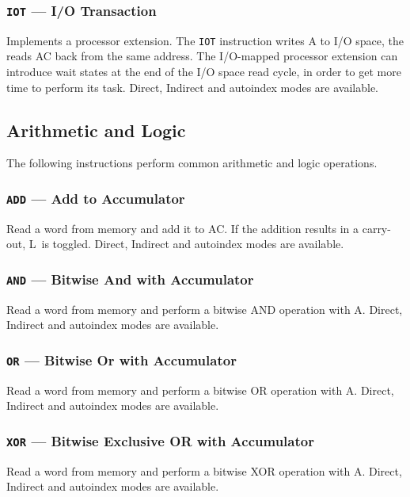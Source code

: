 \documentclass[11pt,a4paper,twocolumns]{article}
\newcommand\register[1]{\textsf{#1}}
\newcommand\A{\register{AC}}
\newcommand\Lreg{\register{L}}
\begin{document}
\subsubsection{{\tt IOT} — I/O Transaction}
\label{sec-iot}

Implements a processor extension. The {\tt IOT} instruction writes A
to I/O space, the reads \A{} back from the same address. The I/O-mapped
processor extension can introduce wait states at the end of the I/O
space read cycle, in order to get more time to perform its
task. Direct, Indirect and autoindex modes are available.

\subsection{Arithmetic and Logic}

The following instructions perform common arithmetic and logic operations.

\subsubsection{{\tt ADD} — Add to Accumulator}
\label{sec-add}

Read a word from memory and add it to \A. If the addition results in a
carry-out, \Lreg\  is toggled. Direct, Indirect and autoindex modes are
available.

\subsubsection{{\tt AND} — Bitwise And with Accumulator}
\label{sec-and}

Read a word from memory and perform a bitwise AND operation with A. Direct, Indirect and autoindex
modes are available.

\subsubsection{{\tt OR} — Bitwise Or with Accumulator}
\label{sec-or}

Read a word from memory and perform a bitwise OR operation with A. Direct, Indirect and autoindex
modes are available.

\subsubsection{{\tt XOR} — Bitwise Exclusive OR with Accumulator}
\label{sec-xor}

Read a word from memory and perform a bitwise XOR operation with A. Direct, Indirect and autoindex
modes are available.
\end{document}
